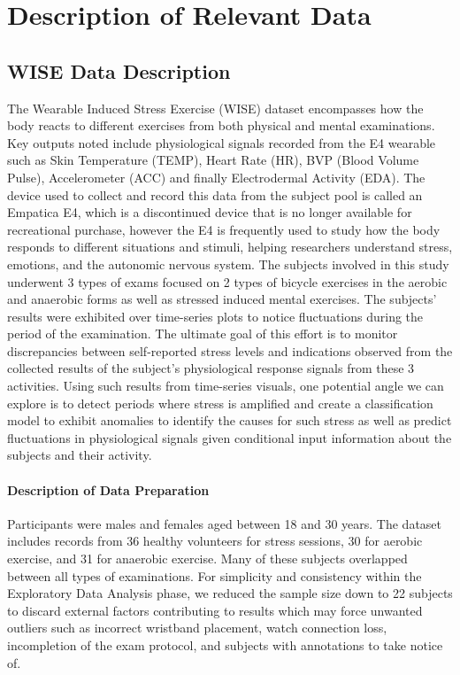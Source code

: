\documentclass[12pt,letterpaper]{article}
\begin{document}
\section{Description of Relevant Data}
\subsection{WISE Data Description}
The Wearable Induced Stress Exercise (WISE) dataset encompasses how the body reacts to different exercises from both physical and mental examinations. Key outputs noted include physiological signals recorded from the E4 wearable such as Skin Temperature (TEMP), Heart Rate (HR), BVP (Blood Volume Pulse), Accelerometer (ACC) and finally Electrodermal Activity (EDA). The device used to collect and record this data from the subject pool is called an Empatica E4, which is a discontinued device that is no longer available for recreational purchase, however the E4 is frequently used to study how the body responds to different situations and stimuli, helping researchers understand stress, emotions, and the autonomic nervous system. The subjects involved in this study underwent 3 types of exams focused on 2 types of bicycle exercises in the aerobic and anaerobic forms as well as stressed induced mental exercises. The subjects' results were exhibited over time-series plots to notice fluctuations during the period of the examination. The ultimate goal of this effort is to monitor discrepancies between self-reported stress levels and indications observed from the collected results of the subject’s physiological response signals from these 3 activities. Using such results from time-series visuals, one potential angle we can explore is to detect periods where stress is amplified and create a classification model to exhibit anomalies to identify the causes for such stress as well as predict fluctuations in physiological signals given conditional input information about the subjects and their activity. 


\paragraph{Description of Data Preparation} 

Participants were males and females aged between 18 and 30 years. The dataset includes records from 36 healthy volunteers for stress sessions, 30 for aerobic exercise, and 31 for anaerobic exercise. Many of these subjects overlapped between all types of examinations. For simplicity and consistency within the Exploratory Data Analysis phase, we reduced the sample size down to 22 subjects to discard external factors contributing to results which may force unwanted outliers such as incorrect wristband placement, watch connection loss, incompletion of the exam protocol, and subjects with annotations to take notice of. 
\end{document}
